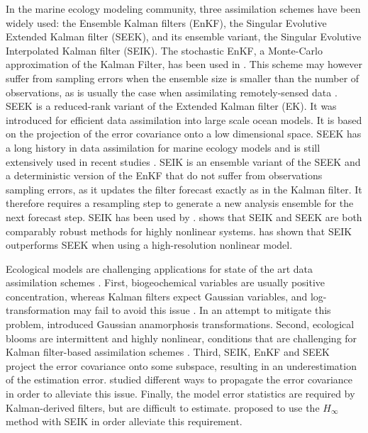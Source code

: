 In the marine ecology modeling community, three assimilation schemes have been
widely used: the Ensemble Kalman filters (EnKF), the Singular Evolutive
Extended Kalman filter (SEEK), and its ensemble variant, the Singular Evolutive
Interpolated Kalman filter (SEIK). The stochastic EnKF, a Monte-Carlo
approximation of the Kalman Filter, has been used in \citet{Ciavatta2011,
Ciavatta2014}. This scheme may however suffer from sampling errors when the
ensemble size is smaller than the number of observations, as is usually the
case when assimilating remotely-sensed data \citep{Nerger2005, Altaf2014}.
SEEK is a reduced-rank variant of the Extended Kalman filter (EK). It was
introduced for efficient data assimilation into large scale ocean models.  It
is based  on the projection of the error covariance onto a low dimensional
space.  SEEK has a long history in data assimilation for marine ecology models
and is still extensively used in recent studies \citep{Fontana2013, Korres2012,
Butenschon2012}.  SEIK is an ensemble variant of the SEEK  and a deterministic
version of the EnKF that do not suffer from observations sampling errors, as it
updates the filter forecast exactly as in the Kalman filter. It therefore
requires a resampling step to generate a new analysis ensemble for the next
forecast step. SEIK has been used by \citet{Triantafyllou2013, Korres2012}.
\citet{Korres2012} shows that SEIK and SEEK are both comparably robust methods
for highly nonlinear systems. \citet{Hoteit2005} has shown that SEIK
outperforms SEEK when using a high-resolution nonlinear model.

Ecological models are challenging applications for state of the art data
assimilation schemes \citep{Edwards2015}. First, biogeochemical variables are
usually positive concentration, whereas Kalman filters expect Gaussian
variables, and log-transformation may fail to avoid this issue
\citep{Ciavatta2011}. In an attempt to mitigate this problem,
\citet{Fontana2013} introduced Gaussian anamorphosis transformations.
Second, ecological blooms are intermittent and highly nonlinear, conditions
that are challenging for Kalman filter-based assimilation schemes
\citep{Hoteit2005}. Third, SEIK, EnKF and SEEK project the
error covariance onto some subspace, resulting in an underestimation of the
estimation error. \citet{Butenschon2012} studied different ways to propagate
the error covariance in order to alleviate this issue. Finally, the model error
statistics are required by Kalman-derived filters, but are difficult to
estimate. \citet{Triantafyllou2013} proposed to use the $H_\infty$ method with
SEIK in order alleviate this requirement.

